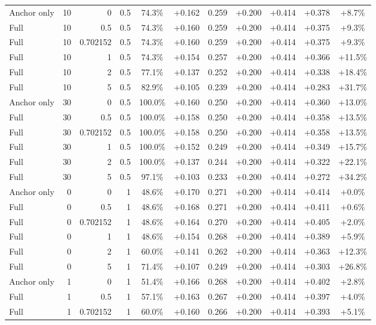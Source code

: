 \begin{table}[htbp]
\begin{tabular}{lrrrccccccc}
Anchor only & 10 & 0 & 0.5 & 74.3\% & +0.162 & 0.259 & +0.200 & +0.414 & +0.378 & +8.7\% \\
Full & 10 & 0.5 & 0.5 & 74.3\% & +0.160 & 0.259 & +0.200 & +0.414 & +0.375 & +9.3\% \\
Full & 10 & 0.702152 & 0.5 & 74.3\% & +0.160 & 0.259 & +0.200 & +0.414 & +0.375 & +9.3\% \\
Full & 10 & 1 & 0.5 & 74.3\% & +0.154 & 0.257 & +0.200 & +0.414 & +0.366 & +11.5\% \\
Full & 10 & 2 & 0.5 & 77.1\% & +0.137 & 0.252 & +0.200 & +0.414 & +0.338 & +18.4\% \\
Full & 10 & 5 & 0.5 & 82.9\% & +0.105 & 0.239 & +0.200 & +0.414 & +0.283 & +31.7\% \\
Anchor only & 30 & 0 & 0.5 & 100.0\% & +0.160 & 0.250 & +0.200 & +0.414 & +0.360 & +13.0\% \\
Full & 30 & 0.5 & 0.5 & 100.0\% & +0.158 & 0.250 & +0.200 & +0.414 & +0.358 & +13.5\% \\
Full & 30 & 0.702152 & 0.5 & 100.0\% & +0.158 & 0.250 & +0.200 & +0.414 & +0.358 & +13.5\% \\
Full & 30 & 1 & 0.5 & 100.0\% & +0.152 & 0.249 & +0.200 & +0.414 & +0.349 & +15.7\% \\
Full & 30 & 2 & 0.5 & 100.0\% & +0.137 & 0.244 & +0.200 & +0.414 & +0.322 & +22.1\% \\
Full & 30 & 5 & 0.5 & 97.1\% & +0.103 & 0.233 & +0.200 & +0.414 & +0.272 & +34.2\% \\
Anchor only & 0 & 0 & 1 & 48.6\% & +0.170 & 0.271 & +0.200 & +0.414 & +0.414 & +0.0\% \\
Full & 0 & 0.5 & 1 & 48.6\% & +0.168 & 0.271 & +0.200 & +0.414 & +0.411 & +0.6\% \\
Full & 0 & 0.702152 & 1 & 48.6\% & +0.164 & 0.270 & +0.200 & +0.414 & +0.405 & +2.0\% \\
Full & 0 & 1 & 1 & 48.6\% & +0.154 & 0.268 & +0.200 & +0.414 & +0.389 & +5.9\% \\
Full & 0 & 2 & 1 & 60.0\% & +0.141 & 0.262 & +0.200 & +0.414 & +0.363 & +12.3\% \\
Full & 0 & 5 & 1 & 71.4\% & +0.107 & 0.249 & +0.200 & +0.414 & +0.303 & +26.8\% \\
Anchor only & 1 & 0 & 1 & 51.4\% & +0.166 & 0.268 & +0.200 & +0.414 & +0.402 & +2.8\% \\
Full & 1 & 0.5 & 1 & 57.1\% & +0.163 & 0.267 & +0.200 & +0.414 & +0.397 & +4.0\% \\
Full & 1 & 0.702152 & 1 & 60.0\% & +0.160 & 0.266 & +0.200 & +0.414 & +0.393 & +5.1\% \\

\end{tabular}
\end{table}
